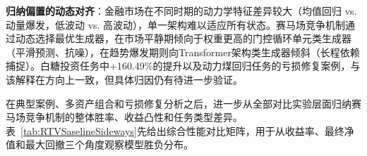 \textbf{归纳偏置的动态对齐}：金融市场在不同时期的动力学特征差异较大（均值回归 vs. 动量爆发，低波动 vs. 高波动），单一架构难以适应所有状态。赛马场竞争机制通过动态选择最优生成器，在市场平静期倾向于权重更高的门控循环单元类生成器（平滑预测、抗噪），在趋势爆发期则向Transformer架构类生成器倾斜（长程依赖捕捉）。白糖投资任务中+160.49\%的提升以及动力煤回归任务的亏损修复案例，与该解释在方向上一致，但具体归因仍有待进一步验证。

%




在典型案例、多资产组合和亏损修复分析之后，进一步从全部对比实验层面归纳赛马场竞争机制的整体胜率、收益凸性和任务类型差异。表~\ref{tab:RTVSaselineSideways}先给出综合性能对比矩阵，用于从收益率、最终净值和最大回撤三个角度观察模型胜负分布。

